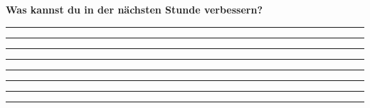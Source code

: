 \documentclass{scrartcl}  %
\begin{document}
\begin{center}
\begin{tcolorbox}
\begin{center}
\begin{tikzpicture}[scale=1]
							\end{tikzpicture}
						\end{center}
						\textbf{{\Large Was kannst du in der nächsten Stunde verbessern?}}
						\begin{center}
							\noindent\rule{12cm}{0.2pt}
							\vspace{1.1cm}
							\noindent\rule{12cm}{0.1pt}
							\vspace{1.1cm}
							\noindent\rule{12cm}{0.1pt}
							\vspace{1.1cm}
							\noindent\rule{12cm}{0.1pt}
							\vspace{1.1cm}
							\noindent\rule{12cm}{0.1pt}
							\vspace{1.1cm}
							\noindent\rule{12cm}{0.1pt}
							\vspace{1.1cm}
							\noindent\rule{12cm}{0.1pt}
							\vspace{1.1cm}
							\noindent\rule{12cm}{0.1pt}
						\end{center}
					\end{tcolorbox}
				\end{center}
								
			
\end{document}
